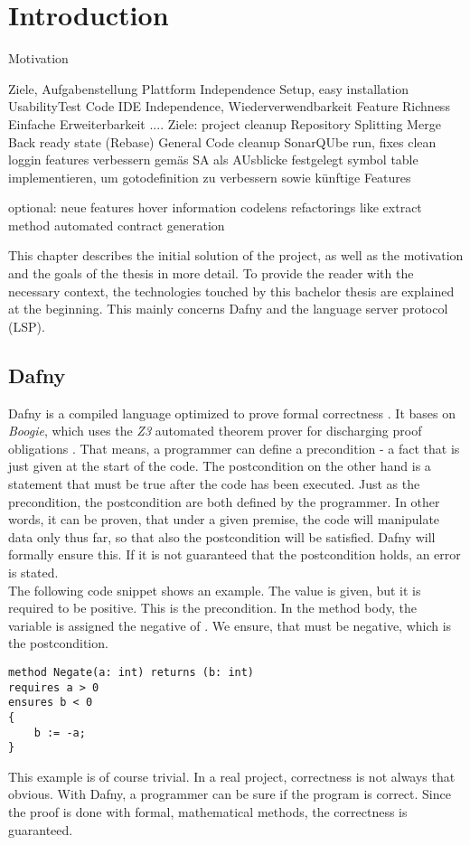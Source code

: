 \section{Introduction}

Motivation

Ziele, Aufgabenstellung
Plattform Independence
Setup, easy installation
UsabilityTest Code
IDE Independence, Wiederverwendbarkeit
Feature Richness
Einfache Erweiterbarkeit
....
Ziele: project cleanup
Repository Splitting
Merge Back ready state (Rebase)
General Code cleanup
SonarQUbe run, fixes
clean loggin
features verbessern gemäs SA als AUsblicke festgelegt
symbol table implementieren, um gotodefinition zu verbessern sowie künftige Features

optional: neue features
hover information
codelens
refactorings like extract method
automated contract generation


\label{section:introduction}
This chapter describes the initial solution of the project, as well as the motivation and the goals of the thesis in more detail.
To provide the reader with the necessary context, the technologies touched by this bachelor thesis are explained at the beginning.
This mainly concerns Dafny and the language server protocol (LSP).

\subsection{Dafny}
\label{section:introduction:dafny}
Dafny is a compiled language optimized to prove formal correctness \cite{dafnyWiki}.
It bases on \textit{Boogie}, which uses the \textit{Z3} automated theorem prover for discharging proof obligations \cite{dafnyWiki}.
That means, a programmer can define a precondition - a fact that is just given at the start of the code.
The postcondition on the other hand is a statement that must be true after the code has been executed.
Just as the precondition, the postcondition are both defined by the programmer.
In other words, it can be proven, that under a given premise, the code will manipulate data only thus far, so that also the postcondition will be satisfied.
Dafny will formally ensure this.
If it is not guaranteed that the postcondition holds, an error is stated.\\

The following code snippet shows an example.
The value  is given, but it is required to be positive.
This is the precondition.
In the method body, the variable  is assigned the negative of .
We ensure, that  must be negative, which is the postcondition.
\begin{lstlisting}[language=dafny, caption={Simple Dafny Example}, captionpos=b, label={lst:simpleDafnyExample}]
method Negate(a: int) returns (b: int)
requires a > 0
ensures b < 0
{
    b := -a;
}
\end{lstlisting}
This example is of course trivial.
In a real project, correctness is not always that obvious.
With Dafny, a programmer can be sure if the program is correct.
Since the proof is done with formal, mathematical methods, the correctness is guaranteed.\\

